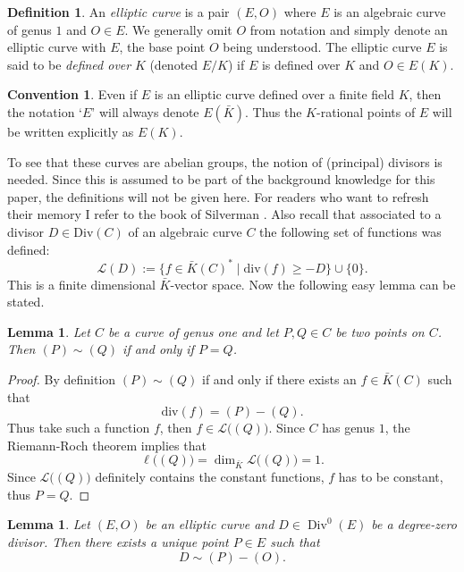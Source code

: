 \documentclass{article}
\numberwithin{equation}{section}
\newtheorem{lemma}[theorem]{Lemma}
\theoremstyle{definition}
\newtheorem{definition}[theorem]{Definition}
\newtheorem*{convention}{Convention}
\newcommand{\Div}{\operatorname{Div}} %
\begin{document}
\begin{definition}\label{ellcurvedefinition}
An \emph{elliptic curve} is a pair $(E,O)$ where $E$ is an algebraic curve of genus $1$ and $O\in E$. We generally omit $O$ from notation and simply denote an elliptic curve with $E$, the base point  $O$ being understood. The elliptic curve $E$ is said to be \emph{defined over} $K$ (denoted $E/K$) if $E$ is defined over $K$ and $O\in E(K)$. 
\end{definition}

\begin{convention}
Even if $E$ is an elliptic curve defined over a finite field $K$, then the notation `$E$' will always denote $E(\bar{K})$. Thus the $K$-rational points of $E$ will be written explicitly as $E(K)$.
\end{convention}

To see that these curves are abelian groups, the notion of (principal) divisors is needed. Since this is assumed to be part of the background knowledge for this paper, the definitions will not be given here. For readers who want to refresh their memory I refer to the book of Silverman \cite[II.3]{Silverman}. Also recall that associated to a divisor $D \in \text{Div}(C)$ of an algebraic curve $C$ the following set of functions was defined: $$\mathcal{L}(D):= \{ f \in \bar{K}(C)^* \; | \; \text{div}(f) \geq -D\} \cup \{0\}.$$ This is a finite dimensional $\bar{K}$-vector space. Now the following easy lemma can be stated.

\begin{lemma}\label{g1ptequality}
Let $C$ be a curve of genus one and let $P,Q \in C$ be two points on $C$. Then $(P) \sim (Q)$ if and only if $P=Q$.
\end{lemma}

\begin{proof}
By definition $(P) \sim (Q)$ if and only if there exists an $f \in \bar{K}(C)$ such that $$\text{div}(f)=(P)-(Q).$$ Thus take such a function $f$, then $f \in \mathcal{L}\big((Q)\big)$. Since $C$ has genus $1$, the Riemann-Roch theorem implies that $$\ell\big((Q)\big)=\dim _{\bar{K}} \mathcal{L}\big((Q)\big) =1.$$ Since $\mathcal{L}\big((Q)\big)$ definitely contains the constant functions, $f$ has to be constant, thus $P=Q$.
\end{proof}

\begin{lemma}
Let $(E,O)$ be an elliptic curve and $D \in \Div^0(E)$ be a degree-zero divisor. Then there exists a unique point $P \in E$ such that $$D \sim (P)-(O).$$
\end{lemma}
\end{document}
